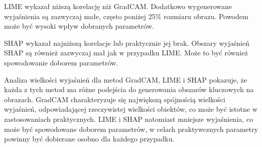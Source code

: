 LIME wykazał niższą korelację niż GradCAM.
Dodatkowo wygenerowane wyjaśnienia są zazwyczaj małe, często poniżej 25\% rozmiaru obrazu.
Powodem może być wysoki wpływ dobranych parametrów.

SHAP wykazał najniższą korelacje lub praktycznie jej brak.
Obszary wyjaśnień SHAP są również zazwyczaj mał jak w przypadku LIME.
Może to być również spowodowanie doborem parametrów.

\vspace{1cm}
Analiza wielkości wyjaśnień dla metod GradCAM, LIME i SHAP pokazuje, że każda z tych metod ma różne podejścia do generowania obszarów kluczowych na obrazach.
GradCAM charakteryzuje się największą spójnością wielkości wyjaśnień, odpowiadającej rzeczywistej wielkości obiektów, co może być istotne w zastosowaniach praktycznych.
LIME i SHAP natomiast mniejsze wyjaśnienia, co może być spowodowane doborem parametrów, w celach praktywcznych parametry powinny być dobierane osobno dla każdego przypadku.

